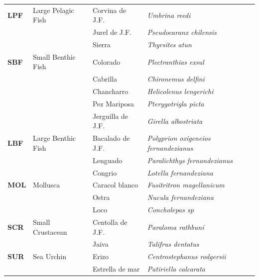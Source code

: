 \documentclass[11pt]{article}
\begin{document}
\begin{center}
\begin{tabular}{lllll}
\hline
 \textbf{LPF}  &  Large Pelagic Fish  &  Corvina de J.F.    &  \emph{Umbrina reedi}                        &     \\
               &                      &  Jurel de J.F.      &  \emph{Pseudocaranx chilensis}               &     \\
               &                      &  Sierra             &  \emph{Thyrsites atun}                       &     \\
\hline
 \textbf{SBF}  &  Small Benthic Fish  &  Colorado           &  \emph{Plectranthias exsul}                  &     \\
               &                      &  Cabrilla           &  \emph{Chironemus delfini}                   &     \\
               &                      &  Chancharro         &  \emph{Helicolenus lengerichi}               &     \\
               &                      &  Pez Mariposa       &  \emph{Pterygotrigla picta}                  &     \\
               &                      &  Jerguilla de J.F.  &  \emph{Girella albostriata}                  &     \\
\hline
 \textbf{LBF}  &  Large Benthic Fish  &  Bacalado de J.F.   &  \emph{Polyprion oxigeneios fernandezianus}  &     \\
               &                      &  Lenguado           &  \emph{Paralichthys fernandezianus}          &     \\
               &                      &  Congrio            &  \emph{Lotella fernandeziana}                &     \\
\hline
 \textbf{MOL}  &  Mollusca            &  Caracol blanco     &  \emph{Fusitritron magellanicum}             &     \\
               &                      &  Ostra              &  \emph{Nucula fernandeziana}                 &     \\
               &                      &  Loco               &  \emph{Concholepas sp}                       &     \\
\hline
 \textbf{SCR}  &  Small Crustacean    &  Centolla de J.F.   &  \emph{Paraloma rathbuni}                    &     \\
               &                      &  Jaiva              &  \emph{Talifrus dentatus}                    &     \\
\hline
 \textbf{SUR}  &  Sea Urchin          &  Erizo              &  \emph{Centrostephanus rodgersii}            &     \\
               &                      &  Estrella de mar    &  \emph{Patiriella calcarata}                 &     \\
\end{tabular}
\end{center}
\end{document}
